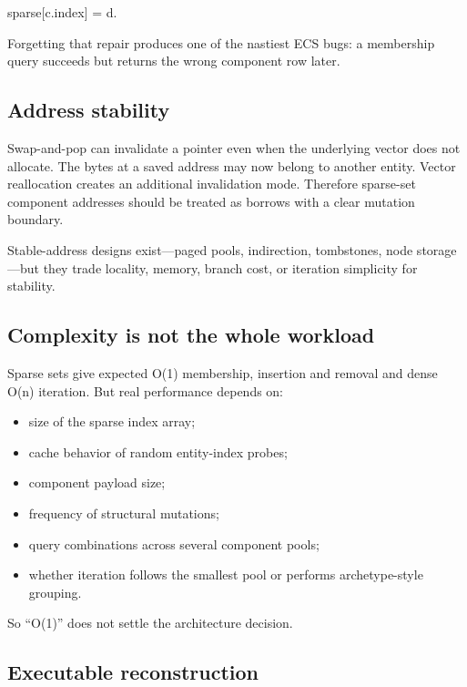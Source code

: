 sparse{[}c.index{]} = d.

Forgetting that repair produces one of the nastiest ECS bugs: a membership query succeeds but returns the wrong component row later.

\subsection{Address stability}\label{appendix-8404d0b1a3e7-address-stability}

Swap-and-pop can invalidate a pointer even when the underlying vector does not allocate. The bytes at a saved address may now belong to another entity. Vector reallocation creates an additional invalidation mode. Therefore sparse-set component addresses should be treated as borrows with a clear mutation boundary.

Stable-address designs exist---paged pools, indirection, tombstones, node storage---but they trade locality, memory, branch cost, or iteration simplicity for stability.

\subsection{Complexity is not the whole workload}\label{appendix-8404d0b1a3e7-complexity-is-not-the-whole-workload}

Sparse sets give expected O(1) membership, insertion and removal and dense O(n) iteration. But real performance depends on:

\begin{itemize}
\tightlist
\item
  size of the sparse index array;
\item
  cache behavior of random entity-index probes;
\item
  component payload size;
\item
  frequency of structural mutations;
\item
  query combinations across several component pools;
\item
  whether iteration follows the smallest pool or performs archetype-style grouping.
\end{itemize}

So ``O(1)'' does not settle the architecture decision.

\subsection{Executable reconstruction}\label{appendix-8404d0b1a3e7-executable-reconstruction}

